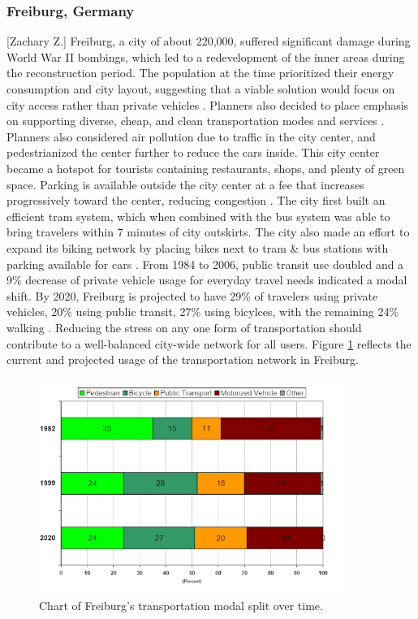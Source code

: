 \documentclass[12pt]{article}                       %
\begin{document}
\subsubsection{Freiburg, Germany}[Zachary Z.]
Freiburg, a city of about 220,000, suffered significant damage during World War II bombings, which led to a redevelopment of the inner areas during the reconstruction period. The population at the time prioritized their energy consumption and city layout, suggesting that a viable solution would focus on city access rather than private vehicles \cite{Rydningen2017OsloCentre}. Planners also decided to place emphasis on supporting diverse, cheap, and clean transportation modes and services \cite{Bindra2006SmartGermany}. Planners also considered air pollution due to traffic in the city center, and pedestrianized the center further to reduce the cars inside. This city center became a hotspot for tourists containing restaurants, shops, and plenty of green space. Parking is available outside the city center at a fee that increases progressively toward the center, reducing congestion \cite{Bindra2006SmartGermany}. The city first built an efficient tram system, which when combined with the bus system was able to bring travelers within 7 minutes of city outskirts. The city also made an effort to expand its biking network by placing bikes next to tram \& bus stations with parking available for cars \cite{Bindra2006SmartGermany}. From 1984 to 2006, public transit use doubled and a 9\% decrease of private vehicle usage for everyday travel needs indicated a modal shift. By 2020, Freiburg is projected to have 29\% of travelers using private vehicles, 20\% using public transit, 27\% using bicylces, with the remaining 24\% walking \cite{Rydningen2017OsloCentre}. Reducing the stress on any one form of transportation should contribute to a well-balanced city-wide network for all users. Figure \ref{img:freiburg_modal_split} reflects the current and projected usage of the transportation network in Freiburg.

\begin{figure}[H]
    \centering
    \includegraphics[width=10cm]{images/freiburg_modal_split.png}
    \caption{Chart of Freiburg's transportation modal split over time.}
    \label{img:freiburg_modal_split}
\end{figure}
\end{document}
